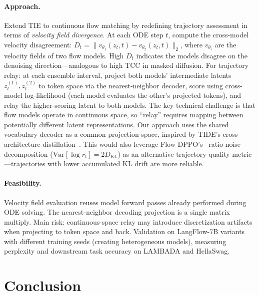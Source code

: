 \documentclass[11pt,a4paper]{article}
\begin{document}
\paragraph{Approach.} Extend TIE to continuous flow matching by redefining trajectory assessment in terms of \emph{velocity field divergence}. At each ODE step $t$, compute the cross-model velocity disagreement: $D_t = \|v_{\theta_1}(z_t, t) - v_{\theta_2}(z_t, t)\|_2$, where $v_{\theta_i}$ are the velocity fields of two flow models. High $D_t$ indicates the models disagree on the denoising direction---analogous to high TCC in masked diffusion. For trajectory relay: at each ensemble interval, project both models' intermediate latents $z_t^{(1)}, z_t^{(2)}$ to token space via the nearest-neighbor decoder, score using cross-model log-likelihood (each model evaluates the other's projected tokens), and relay the higher-scoring latent to both models. The key technical challenge is that flow models operate in continuous space, so ``relay'' requires mapping between potentially different latent representations. Our approach uses the shared vocabulary decoder as a common projection space, inspired by TIDE's cross-architecture distillation~\cite{li2026tide}. This would also leverage Flow-DPPO's~\cite{ping2026flowdppo} ratio-noise decomposition ($\mathrm{Var}[\log r_t] = 2D_{\mathrm{KL}}$) as an alternative trajectory quality metric---trajectories with lower accumulated KL drift are more reliable.

\paragraph{Feasibility.} Velocity field evaluation reuses model forward passes already performed during ODE solving. The nearest-neighbor decoding projection is a single matrix multiply. Main risk: continuous-space relay may introduce discretization artifacts when projecting to token space and back. Validation on LangFlow-7B variants with different training seeds (creating heterogeneous models), measuring perplexity and downstream task accuracy on LAMBADA and HellaSwag.

\section{Conclusion}
\end{document}
